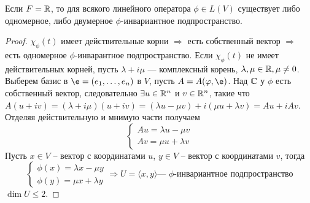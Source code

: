 \begin{Theorem}
  Если $F = \mathbb{R}$, то для всякого линейного оператора $\phi \in L(V)$ существует либо одномерное, либо двумерное $\phi$-инвариантное подпространство.
\end{Theorem}

\begin{proof}
  $\chi_{\phi}(t)$ имеет действительные корни $\Rightarrow$ есть собственный вектор $\Rightarrow$ есть одномерное $\phi$-инварантное подпространство. Если $\chi_{\phi}(t)$ не имеет действительных корней, пусть $\lambda + i \mu$ --- комплексный корень, $\lambda, \mu \in \mathbb{R}, \mu \ne 0$. Выберем базис в $\e = (e_1, \ldots, e_n)$ в $V$, пусть $A = A(\phi, \e)$. Над $\mathbb{C}$ у $\phi$ есть собственный вектор, следовательно $\exists u \in \mathbb{R}^n$ и $v \in \mathbb{R}^n$, такие что $A(u + iv) = (\lambda + i \mu)(u + iv) = (\lambda u - \mu v) + i(\mu u + \lambda v) = Au + iAv$. Отделяя действительную и мнимую части получаем
  \[
    \begin{cases}
      Au = \lambda u - \mu v \\
      Av = \mu u + \lambda v
    \end{cases}
  \]
  Пусть $x \in V$ -- вектор с координатами $u$, $y \in V$ -- вектор с координатами $v$, тогда
  \[
    \begin{cases}
      \phi(x) = \lambda x - \mu y \\
      \phi(y) = \mu x + \lambda y
    \end{cases} \Rightarrow U = \langle x, y \rangle \text{--- $\phi$-инвариантное подпространство}
  \]
  $\dim U \leqslant 2$.
\end{proof}